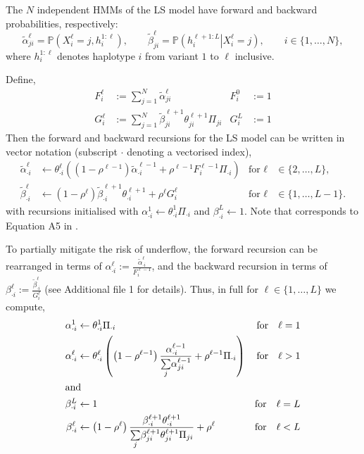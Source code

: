 \documentclass[pdflatex,referee,lineno,sn-nature]{sn-jnl}%
\begin{document}
The \(N\) independent HMMs of the LS model have forward and backward probabilities, respectively: \begin{equation*}
	\tilde{\alpha}_{ji}^{\ell} = \mathbb{P}\left( X_i^\ell = j, h_i^{1:\ell} \right), \qquad
	\tilde{\beta}_{ji}^{\ell} = \mathbb{P}\left(\left.  h_i^{\ell+1 : L}  \right| X_i^\ell = j \right), \qquad i \in \{1,\dots,N\} ,
\end{equation*}
where \(h_{i}^{1:\ell}\) denotes haplotype \(i\) from variant \(1\) to \(\ell\) inclusive.

Define,
\begin{align}
	F_i^\ell &:= \sum_{j=1}^N \tilde{\alpha}_{ji}^{\ell} & F_i^{0} &:= 1 \label{eq:F} \\
	G_i^\ell &:= \sum_{j=1}^N \tilde{\beta}_{ji}^{\ell+1}\theta_{ji}^{\ell+1} \Pi_{ji} & G_i^L &:= 1 \label{eq:G}
\end{align}
Then the forward and backward recursions for the LS model can be written in vector notation (subscript \(\cdot\) denoting a vectorised index),
\begin{align}
	\tilde{\alpha}_{\cdot i}^{\ell} &\gets \theta^{\ell}_{\cdot i} \left( \left(1-\rho^{\ell-1}\right) \tilde{\alpha}_{\cdot i}^{\ell-1} + \rho^{\ell-1} F_i^{\ell-1} \Pi_{\cdot i} \right) & \text{for } \ell &\in \{2,\dots,L\}, \label{eq:raw_forward} \\
	\tilde{\beta}_{\cdot i}^{\ell} &\gets \left( 1- \rho^{\ell}\right) \tilde{\beta}_{\cdot i}^{\ell+1} \theta^{\ell+1}_{\cdot i} + \rho^{\ell} G_i^\ell & \text{for } \ell &\in \{1,\dots,L-1\} \label{eq:raw_backward}.
\end{align}
with recursions initialised with \(\alpha_{\cdot i}^{1} \gets \theta^{1}_{\cdot i} \Pi_{\cdot i}\) and \(\beta_{\cdot i}^{L} \gets 1\).
Note that  corresponds to Equation A5 in \cite{Li2213}.

To partially mitigate the risk of underflow, the forward recursion can be rearranged in terms of \(\alpha_{\cdot i}^{\ell} := \frac{\tilde{\alpha}_{\cdot i}^{\ell}}{ F_i^{\ell-1}}\), and the backward recursion in terms of \(\beta_{\cdot i}^{\ell} := \frac{\tilde{\beta}_{\cdot i}^{\ell}}{G_i^{\ell}}\) (see Additional file 1 for details).
Thus, in full for \(\ell \in \{1,\dots,L\}\) we compute,
\begin{align}
	\alpha_{\cdot i}^{1} &\gets \theta^{1}_{\cdot i} \Pi_{\cdot i} &\textrm{for} \quad \ell = 1 \label{eq:fwd0} \\
	\alpha_{\cdot i}^{\ell} &\gets \theta^{\ell}_{\cdot i} \left( \left(1-\rho^{\ell-1}\right) \frac{\alpha_{\cdot i}^{\ell-1}}{\underset{j}{\sum} \alpha_{ji}^{\ell-1}} + \rho^{\ell-1} \Pi_{\cdot i} \right) &\textrm{for} \quad \ell > 1 \label{eq:fwd1} \\ \intertext{and}
	\beta_{\cdot i}^{L} &\gets 1 &\textrm{for} \quad \ell = L \label{eq:bck0} \\
	\beta_{\cdot i}^{\ell} &\gets \left( 1- \rho^{\ell}\right) \frac{\beta_{\cdot i}^{\ell+1} \theta^{\ell+1}_{\cdot i}}{\underset{j}{\sum} \beta_{ji}^{\ell+1}\theta_{ji}^{\ell+1} \Pi_{ji}} + \rho^\ell &\textrm{for} \quad \ell < L \label{eq:bck1}
\end{align}
\end{document}
